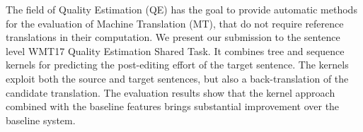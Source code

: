 The field of Quality Estimation (QE) has the goal to provide automatic methods for the evaluation of Machine Translation (MT), that do not require reference translations in their computation. We present our submission to the sentence level WMT17 Quality Estimation Shared Task. It combines tree and sequence kernels for predicting the post-editing effort of the target sentence. The kernels exploit both the source and target sentences, but also a back-translation of the candidate translation. The evaluation results show that the kernel approach combined with the baseline features brings substantial improvement over the baseline system.
